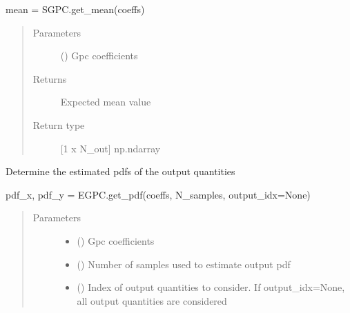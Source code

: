 \documentclass[letterpaper,10pt,english,openany,oneside]{sphinxmanual}
\begin{document}
\begin{fulllineitems}
\begin{fulllineitems}
mean = SGPC.get\_mean(coeffs)
\begin{quote}\begin{description}
\item[{Parameters}] \leavevmode
{} (\sphinxstyleliteralemphasis{\sphinxupquote{{[}}}\sphinxstyleliteralemphasis{\sphinxupquote{{]} }}) \textendash{} Gpc coefficients

\item[{Returns}] \leavevmode
{} \textendash{} Expected mean value

\item[{Return type}] \leavevmode
{[}1 x N\_out{]} np.ndarray

\end{description}\end{quote}

\end{fulllineitems}


\begin{fulllineitems}
\label{\detokenize{pygpc:pygpc.EGPC.EGPC.get_pdf}}
Determine the estimated pdfs of the output quantities

pdf\_x, pdf\_y = EGPC.get\_pdf(coeffs, N\_samples, output\_idx=None)
\begin{quote}\begin{description}
\item[{Parameters}] \leavevmode\begin{itemize}
\item {} 
 (\sphinxstyleliteralemphasis{\sphinxupquote{{[}}}\sphinxstyleliteralemphasis{\sphinxupquote{{]} }}) \textendash{} Gpc coefficients

\item {} 
 () \textendash{} Number of samples used to estimate output pdf

\item {} 
 (\sphinxstyleliteralemphasis{\sphinxupquote{{[}}}\sphinxstyleliteralemphasis{\sphinxupquote{{]} }}\sphinxstyleliteralemphasis{\sphinxupquote{, }}\sphinxstyleliteralemphasis{\sphinxupquote{, }}) \textendash{} Index of output quantities to consider.
If output\_idx=None, all output quantities are considered


\end{itemize}
\end{description}
\end{quote}
\end{fulllineitems}
\end{fulllineitems}
\end{document}
